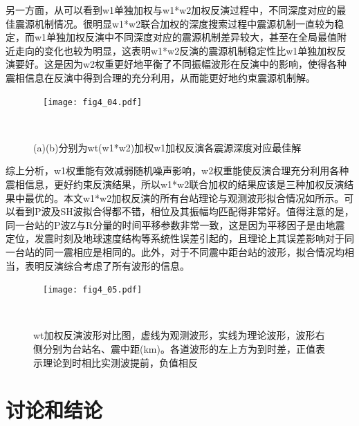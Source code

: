 另一方面，从可以看到w1单独加权与w1*w2加权反演过程中，不同深度对应的最佳震源机制情况。很明显w1*w2联合加权的深度搜索过程中震源机制一直较为稳定，而w1单独加权反演中不同深度对应的震源机制差异较大，甚至在全局最值附近走向的变化也较为明显，这表明w1*w2反演的震源机制稳定性比w1单独加权反演要好。这是因为w2权重更好地平衡了不同振幅波形在反演中的影响，使得各种震相信息在反演中得到合理的充分利用，从而能更好地约束震源机制解。
\begin{figure}
\centering
  \texttt{[image: fig4\_04.pdf]}
  \caption{ (a)(b)分别为wt(w1*w2)加权w1加权反演各震源深度对应最佳解}
  \label{fig4_04}
\end{figure}

综上分析，w1权重能有效减弱随机噪声影响，w2权重能使反演合理充分利用各种震相信息，更好约束反演结果，所以w1*w2联合加权的结果应该是三种加权反演结果中最优的。本文w1*w2加权反演的所有台站理论与观测波形拟合情况如所示。可以看到P波及SH波拟合得都不错，相位及其振幅均匹配得非常好。值得注意的是，同一台站的P波Z与R分量的时间平移参数非常一致，这是因为平移因子是由地震定位，发震时刻及地球速度结构等系统性误差引起的，且理论上其误差影响对于同一台站的同一震相应是相同的。此外，对于不同震中距台站的波形，拟合情况均相当，表明反演综合考虑了所有波形的信息。
\begin{figure}
\centering
  \texttt{[image: fig4\_05.pdf]}
  \caption{ wt加权反演波形对比图，虚线为观测波形，实线为理论波形，波形右侧分别为台站名、震中距(km)。各道波形的左上方为到时差，正值表示理论到时相比实测波提前，负值相反}
  \label{fig4_05}
\end{figure}

\section{讨论和结论}

